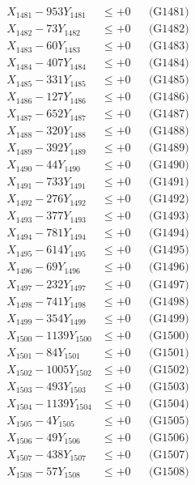 \documentclass[a4paper,10pt]{article}
\begin{document}
{\begin{align}
\allowbreak
X_{1481} - 953Y_{1481} &\leq +0 && \text{(G1481)} \\
X_{1482} - 73Y_{1482} &\leq +0 && \text{(G1482)} \\
X_{1483} - 60Y_{1483} &\leq +0 && \text{(G1483)} \\
X_{1484} - 407Y_{1484} &\leq +0 && \text{(G1484)} \\
X_{1485} - 331Y_{1485} &\leq +0 && \text{(G1485)} \\
X_{1486} - 127Y_{1486} &\leq +0 && \text{(G1486)} \\
X_{1487} - 652Y_{1487} &\leq +0 && \text{(G1487)} \\
X_{1488} - 320Y_{1488} &\leq +0 && \text{(G1488)} \\
X_{1489} - 392Y_{1489} &\leq +0 && \text{(G1489)} \\
X_{1490} - 44Y_{1490} &\leq +0 && \text{(G1490)} \\
\allowbreak
X_{1491} - 733Y_{1491} &\leq +0 && \text{(G1491)} \\
X_{1492} - 276Y_{1492} &\leq +0 && \text{(G1492)} \\
X_{1493} - 377Y_{1493} &\leq +0 && \text{(G1493)} \\
X_{1494} - 781Y_{1494} &\leq +0 && \text{(G1494)} \\
X_{1495} - 614Y_{1495} &\leq +0 && \text{(G1495)} \\
X_{1496} - 69Y_{1496} &\leq +0 && \text{(G1496)} \\
X_{1497} - 232Y_{1497} &\leq +0 && \text{(G1497)} \\
X_{1498} - 741Y_{1498} &\leq +0 && \text{(G1498)} \\
X_{1499} - 354Y_{1499} &\leq +0 && \text{(G1499)} \\
X_{1500} - 1139Y_{1500} &\leq +0 && \text{(G1500)} \\
\allowbreak
X_{1501} - 84Y_{1501} &\leq +0 && \text{(G1501)} \\
X_{1502} - 1005Y_{1502} &\leq +0 && \text{(G1502)} \\
X_{1503} - 493Y_{1503} &\leq +0 && \text{(G1503)} \\
X_{1504} - 1139Y_{1504} &\leq +0 && \text{(G1504)} \\
X_{1505} - 4Y_{1505} &\leq +0 && \text{(G1505)} \\
X_{1506} - 49Y_{1506} &\leq +0 && \text{(G1506)} \\
X_{1507} - 438Y_{1507} &\leq +0 && \text{(G1507)} \\
X_{1508} - 57Y_{1508} &\leq +0 && \text{(G1508)} \\

\end{align}}
\end{document}
